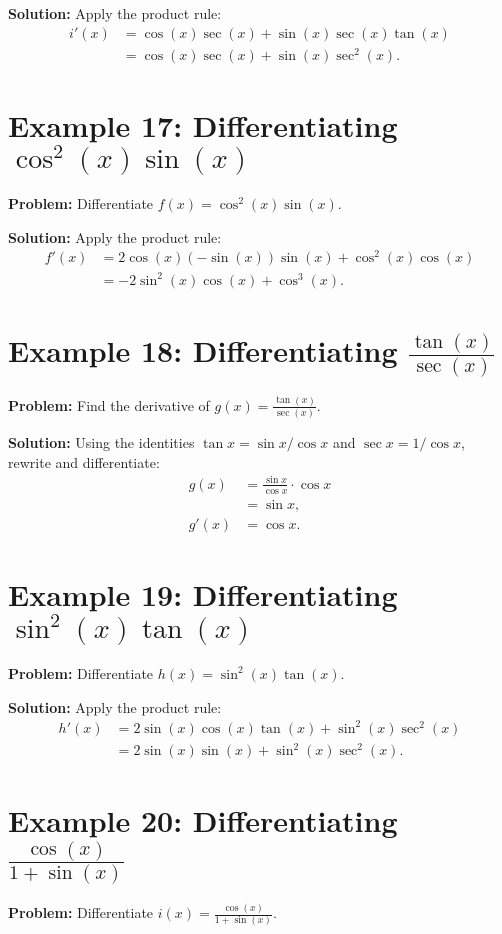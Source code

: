 \documentclass[a4paper,12pt]{book}
\begin{document}
\textbf{Solution:}
Apply the product rule:
\begin{align*}
i'(x) &= \cos(x)\sec(x) + \sin(x)\sec(x)\tan(x) \\
&= \cos(x)\sec(x) + \sin(x)\sec^2(x).
\end{align*}


\section*{Example 17: Differentiating $\cos^2(x)\sin(x)$}
\textbf{Problem:} Differentiate $f(x) = \cos^2(x)\sin(x)$.

\textbf{Solution:}
Apply the product rule:
\begin{align*}
f'(x) &= 2\cos(x)(-\sin(x))\sin(x) + \cos^2(x)\cos(x) \\
&= -2\sin^2(x)\cos(x) + \cos^3(x).
\end{align*}

\section*{Example 18: Differentiating $\frac{\tan(x)}{\sec(x)}$}
\textbf{Problem:} Find the derivative of $g(x) = \frac{\tan(x)}{\sec(x)}$.

\textbf{Solution:}
Using the identities $\tan x = \sin x / \cos x$ and $\sec x = 1 / \cos x$, rewrite and differentiate:
\begin{align*}
g(x) &= \frac{\sin x}{\cos x} \cdot \cos x \\
&= \sin x, \\
g'(x) &= \cos x.
\end{align*}

\section*{Example 19: Differentiating $\sin^2(x)\tan(x)$}
\textbf{Problem:} Differentiate $h(x) = \sin^2(x)\tan(x)$.

\textbf{Solution:}
Apply the product rule:
\begin{align*}
h'(x) &= 2\sin(x)\cos(x)\tan(x) + \sin^2(x)\sec^2(x) \\
&= 2\sin(x)\sin(x) + \sin^2(x)\sec^2(x).
\end{align*}

\section*{Example 20: Differentiating $\frac{\cos(x)}{1 + \sin(x)}$}
\textbf{Problem:} Differentiate $i(x) = \frac{\cos(x)}{1 + \sin(x)}$.
\end{document}
